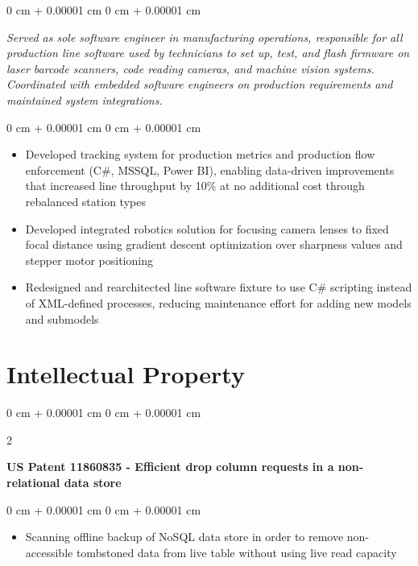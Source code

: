 \documentclass[10pt, letterpaper]{article}
\DeclareRobustCommand{\decorativeicon}[1]{%
    \BeginAccSupp{method=escape,ActualText={}}#1\EndAccSupp{}%
}
\newenvironment{highlights}{
    \begin{itemize}[
        topsep=0.10 cm,
        parsep=0.10 cm,
        partopsep=0pt,
        itemsep=0pt,
        leftmargin=0 cm + 10pt
    ]
}{
    \end{itemize}
} %
\newenvironment{onecolentry}{
    \begin{adjustwidth}{
        0 cm + 0.00001 cm
    }{
        0 cm + 0.00001 cm
    }
}{
    \end{adjustwidth}
} %
\newenvironment{twocolentry}[2][]{
    \needspace{4\baselineskip} %
    \onecolentry
    \def\secondColumn{#2}
    \setcolumnwidth{\fill, 4.5 cm}
    \begin{paracol}{2}
}{
    \switchcolumn \raggedleft \secondColumn
    \end{paracol}
    \endonecolentry
} %
\begin{document}
        \vspace{0.05 cm}
        \begin{onecolentry}
            \textit{Served as sole software engineer in manufacturing operations, responsible for all production line software used by technicians to set up, test, and flash firmware on laser barcode scanners, code reading cameras, and machine vision systems. Coordinated with embedded software engineers on production requirements and maintained system integrations.}
        \end{onecolentry}

        \vspace{0.05 cm}
        \begin{onecolentry}
            \begin{highlights}
                \item Developed tracking system for production metrics and production flow enforcement (C\#, MSSQL, Power BI), enabling data-driven improvements that increased line throughput by 10\% at no additional cost through rebalanced station types
                \item Developed integrated robotics solution for focusing camera lenses to fixed focal distance using gradient descent optimization over sharpness values and stepper motor positioning
                \item Redesigned and rearchitected line software fixture to use C\# scripting instead of XML-defined processes, reducing maintenance effort for adding new models and submodels
            \end{highlights}
        \end{onecolentry}

    
    \section{\texorpdfstring{\decorativeicon{\faFileSignature}\enspace}{}Intellectual Property}

        \begin{samepage}
            \begin{twocolentry}{
            
            }
                \textbf{US Patent 11860835 - Efficient drop column requests in a non-relational data store}
            \end{twocolentry}

            \vspace{0.10 cm}
            
            \begin{onecolentry}
                \begin{highlights}
                    \item Scanning offline backup of NoSQL data store in order to remove non-accessible tombstoned data from live table without using live read capacity
                \end{highlights}
            \end{onecolentry}
        \end{samepage}
\end{document}
